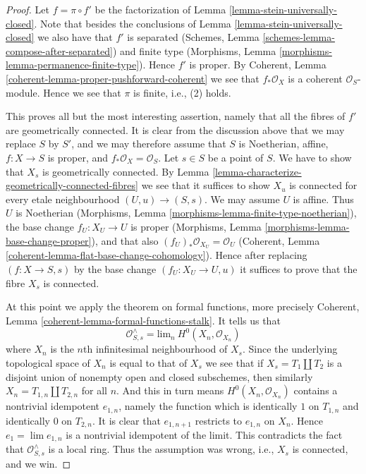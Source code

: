 \begin{proof}
Let $f = \pi \circ f'$ be the factorization of
Lemma \ref{lemma-stein-universally-closed}. Note that besides the
conclusions of Lemma \ref{lemma-stein-universally-closed} we
also have that $f'$ is separated
(Schemes, Lemma \ref{schemes-lemma-compose-after-separated})
and finite type
(Morphisms, Lemma \ref{morphisms-lemma-permanence-finite-type}).
Hence $f'$ is proper. By
Coherent, Lemma \ref{coherent-lemma-proper-pushforward-coherent}
we see that $f_*\mathcal{O}_X$ is a coherent $\mathcal{O}_S$-module.
Hence we see that $\pi$ is finite, i.e., (2) holds.

\medskip\noindent
This proves all but the most interesting assertion, namely that
all the fibres of $f'$ are geometrically connected.
It is clear from the discussion above that we may replace $S$ by $S'$,
and we may therefore assume that $S$ is Noetherian, affine,
$f : X \to S$ is proper, and $f_*\mathcal{O}_X = \mathcal{O}_S$.
Let $s \in S$ be a point of $S$. We have to show that $X_s$ is
geometrically connected. By Lemma
\ref{lemma-characterize-geometrically-connected-fibres}
we see that it suffices to show $X_u$ is connected
for every etale neighbourhood $(U, u) \to (S, s)$.
We may assume $U$ is affine. Thus $U$ is Noetherian
(Morphisms, Lemma \ref{morphisms-lemma-finite-type-noetherian}),
the base change $f_U : X_U \to U$ is proper
(Morphisms, Lemma \ref{morphisms-lemma-base-change-proper}),
and that also $(f_U)_*\mathcal{O}_{X_U} = \mathcal{O}_U$
(Coherent, Lemma \ref{coherent-lemma-flat-base-change-cohomology}).
Hence after replacing
$(f : X \to S, s)$ by the base change $(f_U : X_U \to U, u)$
it suffices to prove that the fibre $X_s$ is connected.

\medskip\noindent
At this point we apply the theorem on formal functions,
more precisely Coherent, Lemma \ref{coherent-lemma-formal-functions-stalk}.
It tells us that
$$
\mathcal{O}^\wedge_{S, s} =
\text{lim}_n\ H^0(X_n, \mathcal{O}_{X_n})
$$
where $X_n$ is the $n$th infinitesimal neighbourhood of $X_s$.
Since the underlying topological space of $X_n$ is equal to that
of $X_s$ we see that if $X_s = T_1 \coprod T_2$ is a disjoint union
of nonempty open and closed subschemes, then similarly
$X_n = T_{1, n} \coprod T_{2, n}$ for all $n$. And this in turn means
$H^0(X_n, \mathcal{O}_{X_n})$ contains a nontrivial idempotent $e_{1, n}$,
namely the function which is identically $1$ on $T_{1, n}$ and
identically $0$ on $T_{2, n}$. It is clear that $e_{1, n + 1}$
restricts to $e_{1, n}$ on $X_n$. Hence $e_1 = \lim e_{1, n}$
is a nontrivial idempotent of the limit. This contradicts the fact
that $\mathcal{O}^\wedge_{S, s}$ is a local ring. Thus the
assumption was wrong, i.e., $X_s$ is connected, and we win.
\end{proof}

